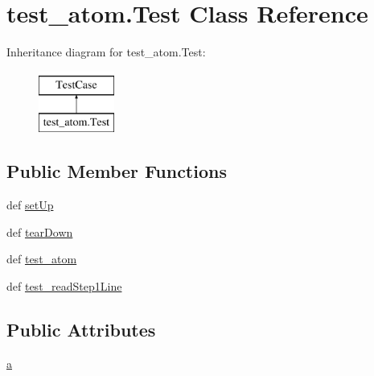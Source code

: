 \hypertarget{classtest__atom_1_1_test}{\section{test\-\_\-atom.\-Test Class Reference}
\label{classtest__atom_1_1_test}
}
Inheritance diagram for test\-\_\-atom.\-Test\-:\begin{figure}[H]
\begin{center}
\leavevmode
\includegraphics[height=2.000000cm]{classtest__atom_1_1_test}
\end{center}
\end{figure}
\subsection*{Public Member Functions}
\begin{DoxyCompactItemize}
\item 
def \hyperlink{classtest__atom_1_1_test_aeec0dbbe10167d3d723e68bb89533cd1}{set\-Up}
\item 
def \hyperlink{classtest__atom_1_1_test_ac516b539f9a0a060a4391539603b643e}{tear\-Down}
\item 
def \hyperlink{classtest__atom_1_1_test_acb79481dc2bf3d9f569075a8f71dcce1}{test\-\_\-atom}
\item 
def \hyperlink{classtest__atom_1_1_test_ac36221e3dd8e2e7c9318d3af919edd6d}{test\-\_\-read\-Step1\-Line}
\end{DoxyCompactItemize}
\subsection*{Public Attributes}
\begin{DoxyCompactItemize}
\item 
\hyperlink{classtest__atom_1_1_test_a6ab6843fb798ca4f1d2c6f3315204768}{a}
\end{DoxyCompactItemize}



